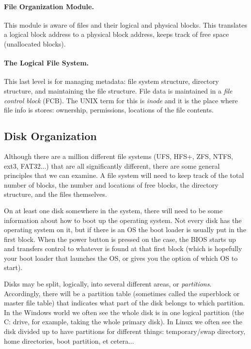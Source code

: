 \paragraph{File Organization Module.} This module is aware of files and their logical and physical blocks. This translates a logical block address to a physical block address, keeps track of free space (unallocated blocks).

\paragraph{The Logical File System.} This last level is for managing metadata: file system structure, directory structure, and maintaining the file structure. File data is maintained in a \textit{file control block} (FCB). The UNIX term for this is \textit{inode} and it is the place where file info is stores: ownership, permissions, locations of the file contents.

\subsection*{Disk Organization}

Although there are a million different file systems (UFS, HFS+, ZFS, NTFS, ext3, FAT32...) that are all significantly different, there are some general principles that we can examine. A file system will need to keep track of the total number of blocks, the number and locations of free blocks, the directory structure, and the files themselves.

On at least one disk somewhere in the system, there will need to be some information about how to boot up the operating system. Not every disk has the operating system on it, but if there is an OS the boot loader is usually put in the first block. When the power button is pressed on the case, the BIOS starts up and transfers control to whatever is found at that first block (which is hopefully your boot loader that launches the OS, or gives you the option of which OS to start).

Disks may be split, logically, into several different areas, or \textit{partitions}. Accordingly, there will be a partition table (sometimes called the superblock or master file table) that indicates what part of the disk belongs to which partition. In the Windows world we often see the whole disk is in one logical partition (the C: drive, for example, taking the whole primary disk). In Linux we often see the disk divided up to have partitions for different things: temporary/swap directory, home directories, boot partition, et cetera...

